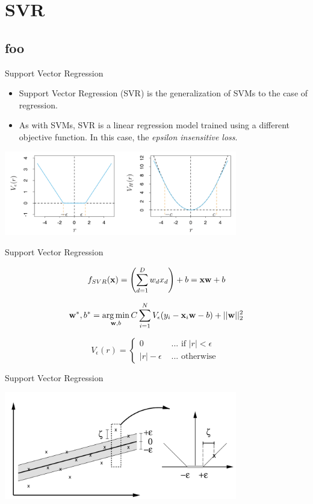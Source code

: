 \documentclass[serif,xcolor=pdftex,dvipsnames,table,hyperref={bookmarks=false,breaklinks}]{beamer}
\begin{document}
\maketitlepage

\section{SVR}
\subsection{foo}

\begin{frame}[t]{Support Vector Regression}

\begin{itemize}
\item Support Vector Regression (SVR) is the generalization of SVMs to the case of regression.

\pause \item As with SVMs, SVR is a linear regression model trained using a different objective function. In this case, the \textit{epsilon insensitive loss}.
\end{itemize}
\pause
\center
\includegraphics[width=4in]{../Figures/svr_loss.png}

\end{frame}

\begin{frame}[t]{Support Vector Regression}

$$f_{SVR}({\mathbf{x}}) = \left(\sum_{d=1}^D w_d x_d\right) + b = {\mathbf{x}}{\mathbf{w}}+b$$

\pause
$${\mathbf{w}}^*,b^* = \operatorname*{arg\,min}_{{\mathbf{w}},b} C\sum_{i=1}^N V_{\epsilon}(y_i - {\mathbf{x}}_i{\mathbf{w}}-b) + ||{\mathbf{w}}||_2^2$$

\pause
$$V_{\epsilon}(r) = 
\left\{
\begin{array}{lr}
0 & \mbox{ ... if } |r|<\epsilon\\
|r|-\epsilon & \mbox{ ... otherwise }
\end{array}
\right.
$$
\end{frame}

\begin{frame}[t]{Support Vector Regression}

\center
\includegraphics[width=4in]{../Figures/svr_example.png}

\end{frame}
\end{document}
